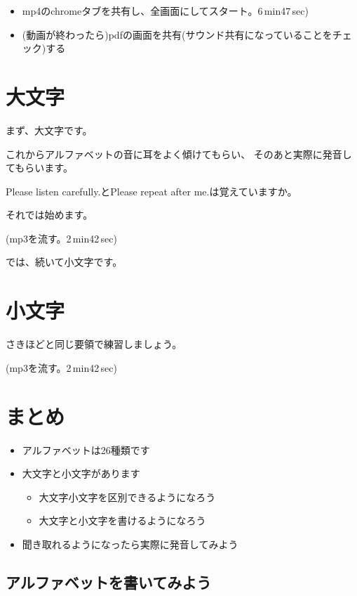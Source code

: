 \documentclass[book,jafontscale=0.9247]{jlreq}
\begin{document}
\begin{tcolorbox}[title=zoomの管理ボタンで]
\begin{itemize}
 \item mp4のchromeタブを共有し、全画面にしてスタート。6\,min47\,sec)
 \item (動画が終わったら)pdfの画面を共有(サウンド共有になっていることをチェック)する
\end{itemize}
 
\end{tcolorbox}



\section{大文字}

まず、大文字です。

これからアルファベットの音に耳をよく傾けてもらい、
そのあと実際に発音してもらいます。

Please listen carefully.とPlease repeat after me.は覚えていますか。

それでは始めます。

(mp3を流す。2\,min42\,sec)

では、続いて小文字です。

\section{小文字}

さきほどと同じ要領で練習しましょう。


(mp3を流す。2\,min42\,sec)


\section{まとめ}

\begin{itemize}
 \item アルファベットは26種類です
 \item 大文字と小文字があります
       \begin{itemize}
	\item 大文字小文字を区別できるようになろう
        \item 大文字と小文字を書けるようになろう
       \end{itemize}
 \item 聞き取れるようになったら実際に発音してみよう
\end{itemize}

\subsection{アルファベットを書いてみよう}
\end{document}

